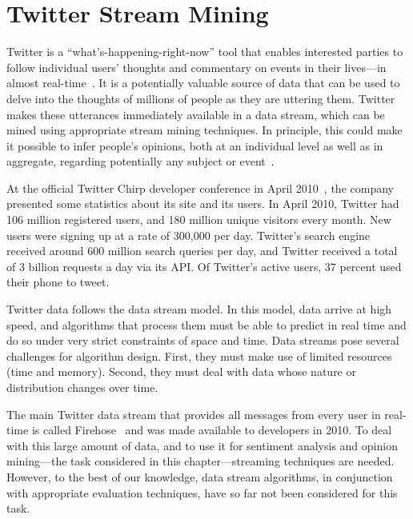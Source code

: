 \chapter{Twitter Stream Mining}
\label{ch:twitter}
\renewcommand{\v}[1]{\ensuremath{\mathbf{#1}}}
Twitter is a ``what's-happening-right-now'' tool that enables interested
parties to follow individual users' thoughts and commentary on events
in their lives---in almost real-time~\cite{tech-crunch}. It is a potentially valuable
source of data that can be used to delve into the thoughts of millions
of people as they are uttering them.  Twitter makes these utterances
immediately available in a data stream, which can be mined using
appropriate stream mining techniques.  In principle, this could make
it possible to infer people's opinions, both at an individual level as
well as in aggregate, regarding potentially any subject or event~\cite{tech-crunch}.


At the official Twitter Chirp developer conference in April 2010~\cite{business-insider}, the
company presented some statistics about its site and its users.  In
April 2010, Twitter had 106 million registered users, and 180 million
unique visitors every month. New users were signing up at a rate of
300,000 per day.  Twitter's search engine received around 600 million
search queries per day, and Twitter received a total of 3 billion
requests a day via its API. Of Twitter's active users, 37 percent used
their phone to tweet.

Twitter data follows the data stream model. In this model, data arrive
at high speed, and algorithms that process them must be able to predict
in real time and do so under very
strict constraints of space and time.  Data streams pose several
challenges for algorithm design. First, they must make use
of limited resources (time and memory).  Second, they must deal with
data whose nature or distribution changes over time.

The main Twitter data stream that provides all messages from every
user in real-time is called Firehose~\cite{streaming-api} and was made available to
developers in 2010. To deal with this large amount of data,
and to use it for sentiment analysis and opinion mining---the task
considered in this chapter---streaming techniques are needed. However,
to the best of our knowledge, data stream algorithms, in conjunction
with appropriate evaluation techniques, have so far not been
considered for this task.

